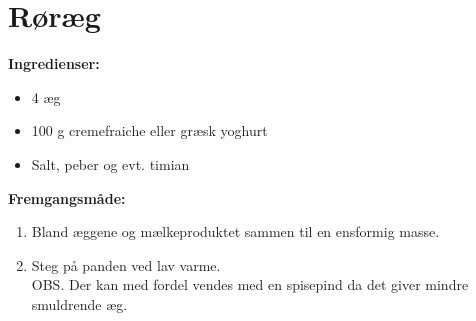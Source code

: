 \documentclass{book}
\begin{document}
\newpage {}
\clearpage \section{Røræg}
\begin{minipage}[t]{0.5\textwidth}
\textbf{Ingredienser:}
\begin{itemize}
\item  4 æg
\item 100 g cremefraiche eller græsk yoghurt
\item Salt, peber og evt. timian
\end{itemize}
\end{minipage}
\begin{minipage}[t]{0.5\textwidth}
 \textbf{Fremgangsmåde:}
\begin{enumerate}
    \item Bland æggene og mælkeproduktet sammen til en ensformig masse. 
    \item Steg på panden ved lav varme.\\
    OBS. Der kan med fordel vendes med en spisepind da det giver mindre smuldrende æg.
\end{enumerate}
\end{minipage}
\end{document}
